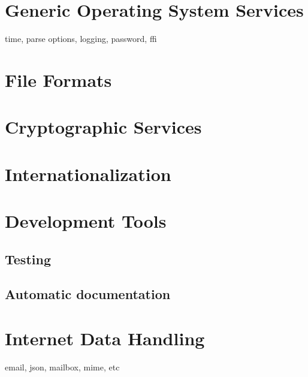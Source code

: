 \documentclass[10pt,english]{book}
\begin{document}
\chapter{Generic Operating System Services}

time, parse options, logging, password, ffi

\chapter{File Formats}

\chapter{Cryptographic Services}

\chapter{Internationalization}

\chapter{Development Tools}

\section{Testing}

\section{Automatic documentation}

\chapter{Internet Data Handling}

email, json, mailbox, mime, etc

\printindex
\end{document}
